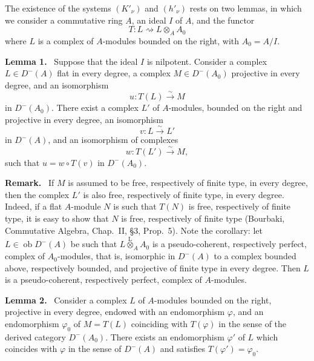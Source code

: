 \documentclass[11pt]{article}
\newenvironment{statement}[1]{\par\medskip\noindent\textbf{#1.}\ }{\par\medskip}
\providecommand{\lten}{\overset{\mathrm L}{\otimes}}
\providecommand{\Ob}{\operatorname{ob}}
\providecommand{\lten}{\overset{\mathrm L}{\otimes}}
\providecommand{\lten}{\overset{\mathrm L}{\otimes}}
\providecommand{\Ob}{\operatorname{ob}}
\providecommand{\lten}{\overset{\mathrm L}{\otimes}}
\providecommand{\lten}{\overset{\mathrm L}{\otimes}}
\providecommand{\Ob}{\operatorname{Ob}}
\providecommand{\lten}{\overset{\mathrm L}{\otimes}}
\providecommand{\Ob}{\operatorname{ob}}
\providecommand{\Ob}{\operatorname{Ob}}
\providecommand{\lten}{\overset{\mathrm L}{\otimes}}
\begin{document}
The existence of the systems $(K'_\nu)$ and $(h'_\nu)$ rests on two lemmas, in which we consider a commutative ring $A$, an ideal $I$ of $A$, and the functor
\[
T:L\rightsquigarrow L\otimes_A A_0
\]
where $L$ is a complex of $A$-modules bounded on the right, with $A_0=A/I$.

\begin{statement}{Lemma 1}
Suppose that the ideal $I$ is nilpotent. Consider a complex $L\in D^-(A)$ flat in every degree, a complex $M\in D^-(A_0)$ projective in every degree, and an isomorphism
\[
u:T(L)\xrightarrow{\sim}M
\]
in $D^-(A_0)$. There exist a complex $L'$ of $A$-modules, bounded on the right and projective in every degree, an isomorphism
\[
v:L\xrightarrow{\sim}L'
\]
in $D^-(A)$, and an isomorphism of complexes
\[
w:T(L')\xrightarrow{\sim}M,
\]
such that $u=w\circ T(v)$ in $D^-(A_0)$.
\end{statement}

\begin{statement}{Remark}
If $M$ is assumed to be free, respectively of finite type, in every degree, then the complex $L'$ is also free, respectively of finite type, in every degree. Indeed, if a flat $A$-module $N$ is such that $T(N)$ is free, respectively of finite type, it is easy to show that $N$ is free, respectively of finite type (Bourbaki, Commutative Algebra, Chap.~II, §3, Prop.~5). Note the corollary: let $L\in\Ob D^-(A)$ be such that $L\lten_A A_0$ is a pseudo-coherent, respectively perfect, complex of $A_0$-modules, that is, isomorphic in $D^-(A)$ to a complex bounded above, respectively bounded, and projective of finite type in every degree. Then $L$ is a pseudo-coherent, respectively perfect, complex of $A$-modules.
\end{statement}

\begin{statement}{Lemma 2}
Consider a complex $L$ of $A$-modules bounded on the right, projective in every degree, endowed with an endomorphism $\varphi$, and an endomorphism $\varphi_0$ of $M=T(L)$ coinciding with $T(\varphi)$ in the sense of the derived category $D^-(A_0)$. There exists an endomorphism $\varphi'$ of $L$ which coincides with $\varphi$ in the sense of $D^-(A)$ and satisfies $T(\varphi')=\varphi_0$.
\end{statement}
\end{document}

